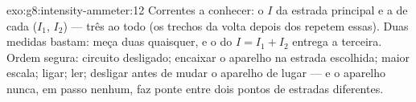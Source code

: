 \begin{solution}{exo:g8:intensity-ammeter:12}
Correntes a conhecer: o $I$ da estrada principal e a de cada 
($I_1$, $I_2$) --- três ao todo (os trechos da volta depois dos 
repetem essas). Duas medidas bastam: meça duas quaisquer, e o
 do  $I = I_1 + I_2$ entrega a terceira. Ordem segura:
circuito desligado; encaixar o aparelho na estrada escolhida; maior
escala; ligar; ler; desligar antes de mudar o aparelho de lugar --- e
o aparelho nunca, em passo nenhum, faz ponte entre dois pontos de
estradas diferentes.
\end{solution}

